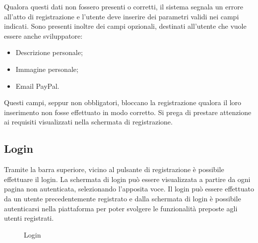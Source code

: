 	Qualora questi dati non fossero presenti o corretti, il sistema segnala un errore all'atto di registrazione e l'utente deve inserire dei parametri validi nei campi indicati. Sono presenti inoltre dei campi opzionali, destinati all'utente che vuole essere anche sviluppatore:
	
	\begin{itemize}
		\item Descrizione personale;
		\item Immagine personale;
		\item Email PayPal.
	\end{itemize}
	
	Questi campi, seppur non obbligatori, bloccano la registrazione qualora il loro inserimento non fosse effettuato in modo corretto. Si prega di prestare attenzione ai requisiti visualizzati nella schermata di registrazione.
	
	\subsection{Login}
	
	Tramite la barra superiore, vicino al pulsante di registrazione è possibile effettuare il login. La schermata di login può essere visualizzata a partire da ogni pagina non autenticata, selezionando l'apposita voce.
	Il login può essere effettuato da un utente precedentemente registrato e dalla schermata di login è possibile autenticarsi nella piattaforma per poter svolgere le funzionalità preposte agli utenti registrati. 
	
	\label{Login}
	\begin{figure}[H]
		\centering
		\caption{Login}
	\end{figure}
	
